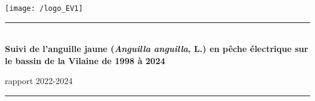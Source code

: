 \documentclass[10pt,twocolumn,titlepage,twoside]{article}\usepackage[]{graphicx}\usepackage[]{xcolor}
\begin{document}
\newpage
{}
\thispagestyle{empty}
\pagecolor{bleu_EV}
\begin{minipage}{\textwidth}
\vspace{30pt}
\hspace{30pt}
\texttt{[image: /logo\_EV1]}
\end{minipage}

\begin{minipage}{0.1\textwidth}
\phantom{This text will be invisible}
\end{minipage}
\begin{minipage}{0.8\textwidth}
\begin{center}
\noindent
{\color{turquoise_EV}\rule{\textwidth}{2.5pt}}\\
\vspace{8mm}
\color{white}
\color{white}
{ \titlefont \huge  \bfseries{Suivi de l'anguille jaune (\textit{Anguilla anguilla}, L.) en pêche
électrique sur le bassin de la Vilaine de 1998 à 2024\\
    }}
\bigskip
{\titlefont  \LARGE rapport 2022-2024\par }
\vspace{4mm}\noindent
{\color{turquoise_EV}\rule{0.9\textwidth}{1.8pt}}\par
\vspace{5mm}
{}
\end{center}
\end{minipage}



\vspace{2cm}%

\begin{minipage}{\textwidth}
\begin{center}
\end{center}
\end{minipage}

\vspace{2cm}%

\begin{minipage}{0.8\textwidth}
\begin{center}
\end{center}
\end{minipage}
\restoregeometry
\clearpage
\normalsize
\pagecolor{white}
\end{document}
